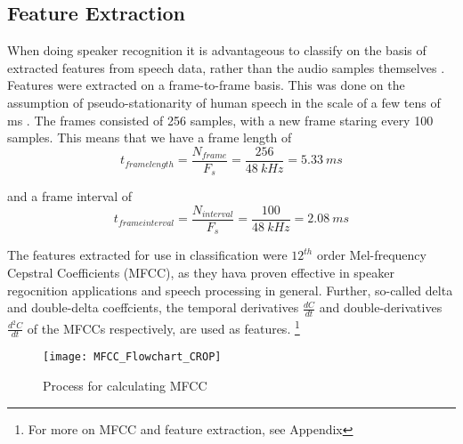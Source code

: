 \subsection*{Feature Extraction}
When doing speaker recognition it is advantageous to classify on the basis of extracted features from speech data, rather than the audio samples themselves \cite{Springer:36}.
Features were extracted on a frame-to-frame basis.
This was done on the assumption of pseudo-stationarity of human speech in the scale of a few tens of ms \cite{Springer:36}.
The frames consisted of 256 samples, with a new frame staring every 100 samples.
This means that we have a frame length of
\begin{equation}
t_{frame length} = \dfrac{N_{frame}}{F_s} = \dfrac{256}{48\ kHz} = 5.33\ ms
\end{equation}

and a frame interval of
\begin{equation}
t_{frame interval} = \dfrac{N_{interval}}{F_s} = \dfrac{100}{48\ kHz} = 2.08\ ms
\end{equation}

The features extracted for use in classification were $12^{th}$ order Mel-frequency Cepstral Coefficients (MFCC), as they hava proven effective in speaker regocnition applications and speech processing in general.
Further, so-called delta and double-delta coeffcients, the temporal derivatives $ \frac{dC}{dt} $ and double-derivatives $\frac{d^2C}{dt}$ of the MFCCs respectively, are used as features.
\footnote{For more on MFCC and feature extraction, see Appendix} 

\begin{figure}[H]
\centering
\texttt{[image: MFCC\_Flowchart\_CROP]}
\caption{Process for calculating MFCC}
\label{fig:MFCC_Flowchart}
\end{figure}
